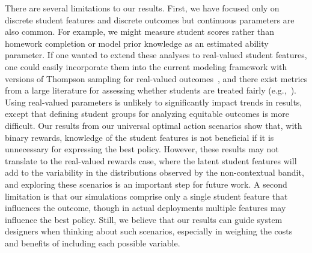 There are several limitations to our results. First, we have focused only on discrete student features and discrete outcomes but continuous parameters are also common. For example, we might measure student scores rather than homework completion or model prior knowledge as an estimated ability parameter. If one wanted to extend these analyses to real-valued student features, one could easily incorporate them into the current modeling framework with versions of Thompson sampling for real-valued outcomes~\cite{agrawal2013thompson}, and there exist metrics from a large literature for assessing whether students are treated fairly (e.g.,~\cite{binns2018fairness}). Using real-valued parameters is unlikely to significantly impact trends in results, except that defining student groups for analyzing equitable outcomes is more difficult. Our results from our universal optimal action scenarios show that, with binary rewards, knowledge of the student features is not beneficial if it is unnecessary for expressing the best policy. However, these results may not translate to the real-valued rewards case, where the latent student features will add to the variability in the distributions observed by the non-contextual bandit, and exploring these scenarios is an important step for future work. 
A second limitation is that our simulations comprise only a single student feature that influences the outcome, though in actual deployments multiple features may influence the best policy. Still, we believe that our results can guide system designers when thinking about such scenarios, especially in weighing the costs and benefits of including each possible variable.


